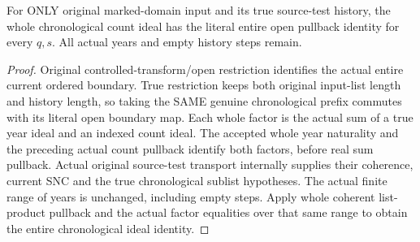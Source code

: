 \begin{theorem}
\label{hir:original-chronological-companion-count-entire-open-pullback}
\leanok
{}
For ONLY original marked-domain input and its true source-test history,
the whole chronological count ideal has the literal entire open pullback
identity for every $q,s$. All actual years and empty history steps remain.
\end{theorem}
\begin{proof}
Original controlled-transform/open restriction identifies the actual entire
current ordered boundary. True restriction keeps both original input-list length
and history length, so taking the SAME genuine chronological prefix commutes
with its literal open boundary map. Each whole factor is the actual sum of a
true year ideal and an indexed count ideal. The accepted whole year naturality
and the preceding actual count pullback identify both factors, before real sum
pullback. Actual original source-test transport internally supplies their
coherence, current SNC and the true chronological sublist hypotheses.
The actual finite range of years is unchanged, including empty steps. Apply
whole coherent list-product pullback and the actual factor equalities over
that same range to obtain the entire chronological ideal identity.
\end{proof}

